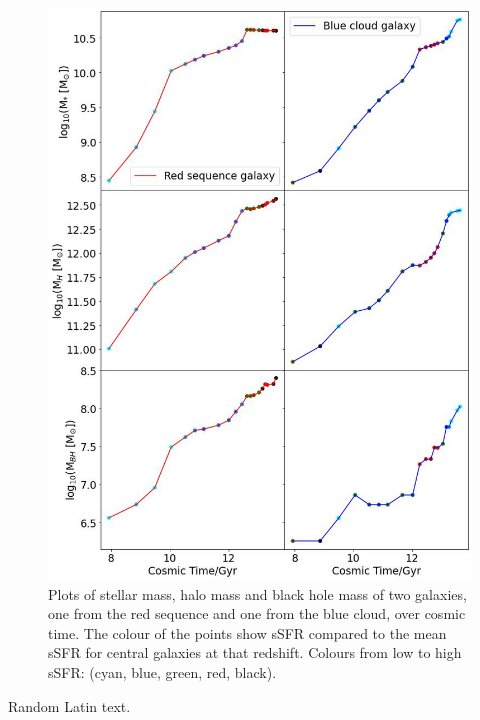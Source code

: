 \documentclass[12pt, onecolumn]{revtex4}    %
\begin{document}
\begin{figure}[H]
\centering
\includegraphics[width=14cm]{Plot_2.jpeg}
\caption{Plots of stellar mass, halo mass and black hole mass of two galaxies, one from the red sequence and one from the blue cloud, over cosmic time. The colour of the points show sSFR compared to the mean sSFR for central galaxies at that redshift. Colours from low to high sSFR: (cyan, blue, green, red, black).}
\label{fig:2}
\end{figure}

\newpage

Random Latin text.
\end{document}
